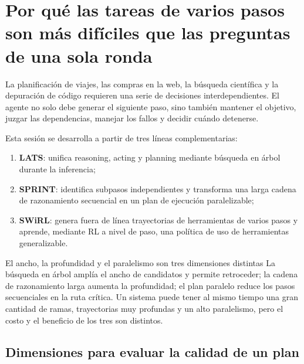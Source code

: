 \documentclass[a4paper]{article}
\begin{document}
\makelecturetitle

\section{Por qué las tareas de varios pasos son más difíciles que las preguntas de una sola ronda}

La planificación de viajes, las compras en la web, la búsqueda científica y la depuración de código requieren una serie de decisiones interdependientes. El agente no solo debe generar el siguiente paso, sino también mantener el objetivo, juzgar las dependencias, manejar los fallos y decidir cuándo detenerse.


Esta sesión se desarrolla a partir de tres líneas complementarias:

\begin{enumerate}
    \item \textbf{LATS}: unifica reasoning, acting y planning mediante búsqueda en árbol durante la inferencia;
    \item \textbf{SPRINT}: identifica subpasos independientes y transforma una larga cadena de razonamiento secuencial en un plan de ejecución paralelizable;
    \item \textbf{SWiRL}: genera fuera de línea trayectorias de herramientas de varios pasos y aprende, mediante RL a nivel de paso, una política de uso de herramientas generalizable.
\end{enumerate}

\begin{importantbox}{El ancho, la profundidad y el paralelismo son tres dimensiones distintas}
La búsqueda en árbol amplía el ancho de candidatos y permite retroceder; la cadena de razonamiento larga aumenta la profundidad; el plan paralelo reduce los pasos secuenciales en la ruta crítica. Un sistema puede tener al mismo tiempo una gran cantidad de ramas, trayectorias muy profundas y un alto paralelismo, pero el costo y el beneficio de los tres son distintos.
\end{importantbox}

\subsection{Dimensiones para evaluar la calidad de un plan}
\end{document}
